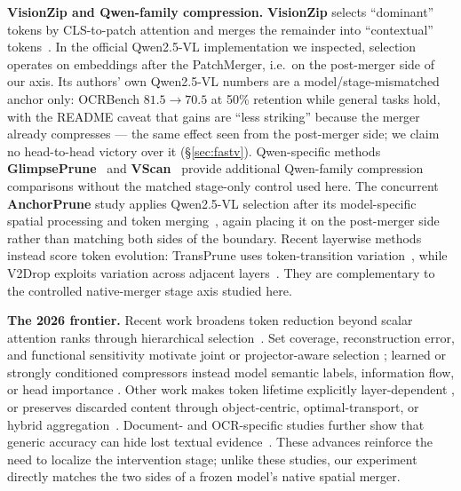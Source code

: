 \documentclass[journal]{IEEEtran}
\begin{document}
\textbf{VisionZip and Qwen-family compression.} \textbf{VisionZip} selects
``dominant'' tokens by CLS-to-patch attention and merges the remainder into
``contextual'' tokens~\cite{yang2024visionzip}. In the official Qwen2.5-VL
implementation we inspected, selection operates on embeddings after the
PatchMerger, i.e.\ on the post-merger side of our axis. Its authors' own
Qwen2.5-VL numbers are a model/stage-mismatched anchor
only: OCRBench $81.5 \to 70.5$ at 50\% retention while general tasks hold, with
the README caveat that gains are ``less striking'' because the merger already
compresses --- the same effect seen from the post-merger side; we claim no
head-to-head victory over it (\S\ref{sec:fastv}). Qwen-specific methods
\textbf{GlimpsePrune}~\cite{zeng2025glimpseprune} and
\textbf{VScan}~\cite{zhang2025vscan} provide additional Qwen-family compression
comparisons without the matched stage-only control used here. The concurrent
\textbf{AnchorPrune} study applies Qwen2.5-VL selection after its model-specific
spatial processing and token merging~\cite{oh2026anchorprune}, again placing it
on the post-merger side rather than matching both sides of the boundary.
Recent layerwise methods instead score token evolution: TransPrune uses
token-transition variation~\cite{li2026transprune}, while V2Drop exploits
variation across adjacent layers~\cite{chen2026v2drop}. They are complementary
to the controlled native-merger stage axis studied here.

\textbf{The 2026 frontier.} Recent work broadens token reduction beyond
scalar attention ranks through hierarchical selection~\cite{sun2026hiloprune}.
Set coverage, reconstruction error, and functional
sensitivity motivate joint or projector-aware selection
\cite{ma2026apet,xu2026score,du2026coin,kim2026zooprune,lee2026spare}; learned
or strongly conditioned compressors instead model semantic labels,
information flow, or head importance
\cite{wang2026metacompress,song2026evocomp,sun2026ifprune,zhu2026hawk}.
Other work makes token lifetime explicitly layer-dependent
\cite{wang2026informationhorizon,chen2026alvts,li2026crisp}, or preserves
discarded content through object-centric, optimal-transport, or hybrid
aggregation~\cite{lei2026core,li2026aot,zhang2026hybrid}. Document- and
OCR-specific studies further show that generic accuracy can hide lost textual
evidence~\cite{choi2026docprune,liu2026provenance}. These advances reinforce
the need to localize the intervention stage; unlike these studies, our
experiment directly matches the two sides of a frozen model's native spatial
merger.
\end{document}

